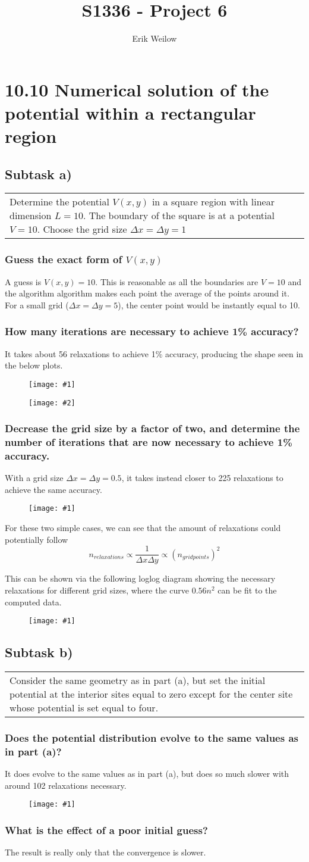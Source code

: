 \documentclass[11pt]{article}
\title{S1336 - Project 6}
\author{Erik Weilow}
\newcommand{\doublefigure}[2]{
\begin{figure}[H]
  \centering
  \begin{minipage}{0.4\textwidth}
    \centering
    \texttt{[image: \#1]}
  \end{minipage}
  \begin{minipage}{0.4\textwidth}
    \centering
    \texttt{[image: \#2]}
  \end{minipage}
\end{figure}
}
\newcommand{\singlefigure}[1]{
\begin{figure}[H]
  \centering
  \begin{minipage}{0.4\textwidth}
    \centering
    \texttt{[image: \#1]}
  \end{minipage}
\end{figure}
}
\newcommand{\task}[2]{
  \subsection*{Subtask #1)}
  \begin{tabular}{|p{0.9\textwidth}}
    #2\\
  \end{tabular}
}
\newcommand{\subtask}[1]{
  \subsubsection*{#1}
}
\begin{document}
\maketitle
\newpage

\section*{10.10 Numerical solution of the potential within a rectangular region}
\task{a}{
  Determine the potential $V(x, y)$ in a square region with linear dimension $L = 10$. 
  The boundary of the square is at a potential $V = 10$. 
  Choose the grid size $\Delta x = \Delta y = 1$
}
\subtask{Guess the exact form of $V(x, y)$}
A guess is $V(x,y) = 10$. This is reasonable as all the boundaries are $V=10$ and the algorithm algorithm makes each point the average of the points around it.
For a small grid ($\Delta x = \Delta y = 5$), the center point would be instantly equal to 10.

\subtask{How many iterations are necessary to achieve 1\% accuracy?}
It takes about 56 relaxations to achieve 1\% accuracy, producing the shape seen in the below plots.
\doublefigure{./plots/1010/a_1.png}{./plots/1010/a_1_eq.png}

\subtask{Decrease the grid size by a factor of two, and determine the number of iterations that are now necessary to achieve 1\% accuracy.}
With a grid size $\Delta x = \Delta y = 0.5$, it takes instead closer to 225 relaxations to achieve the same accuracy. 
\singlefigure{./plots/1010/a_2.png}
For these two simple cases, we can see that the amount of relaxations could potentially follow
$$
n_{relaxations} \propto \frac{1}{\Delta x \Delta y} \propto \left( n_{gridpoints} \right)^2
$$

This can be shown via the following loglog diagram showing the necessary relaxations for different grid sizes,
where the curve $0.56 n^2$ can be fit to the computed data.
\singlefigure{./plots/1010/a_1_dependency.png}

\task{b}{
  Consider the same geometry as in part (a), but set the initial potential at the interior sites
  equal to zero except for the center site whose potential is set equal to four.
}
\subtask{Does the potential distribution evolve to the same values as in part (a)?}
It does evolve to the same values as in part (a), but does so much slower with around 102 relaxations necessary.
\singlefigure{./plots/1010/b_1.png}

\subtask{What is the effect of a poor initial guess?}
The result is really only that the convergence is slower.
\end{document}
